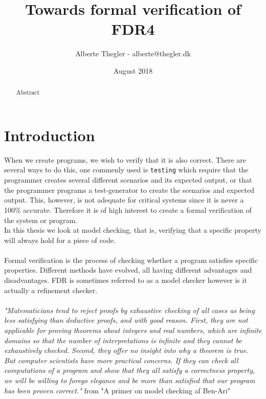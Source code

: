 \documentclass[a4paper]{report}
\title{Towards formal verification of FDR4}
\author{Alberte Thegler - alberte@thegler.dk}
\date{August 2018}
\begin{document}
\maketitle

\begin{abstract}
\begin{doublespace}
Abstract

\end{doublespace}
\end{abstract}



\newpage
\tableofcontents

\newpage
{}
\chapter{Introduction}
When we create programs, we wish to verify that it is also correct. There are several ways to do this, one commenly used is \texttt{testing} which require that the programmer creates several different scenarios and its expected output, or that the programmer programs a test-generator to create the scenarios and expected output. This, however, is not adequate for critical systems since it is never a 100\% accurate. Therefore it is of high interest to create a formal verification of the system or program.\\


In this thesis we look at model checking, that is, verifying that a specific property will always hold for a piece of code.
\\\\

Formal verification is the process of checking whether a program satisfies specific properties. Different methods have evolved, all having different advantages and disadvantages. FDR is sometimes referred to as a model checker however is it actually a refinement checker.
\\\\


\textit{"Matematicians tend to reject proofs by exhaustive checking of all cases as being less satisfying than deductive proofs, and with good reason. First, they are not applicable for proving theorems about integers and real numbers, which are infinite domains so that the number of interpretations is infinite and they cannot be exhaustively checked. Second, they offer no insight into why a theorem is true. But computer scientists have more practical concerns. If they can check all computations of a program and show that they all satisfy a correctness property, we will be willing to forego elegance and be more than satisfied that our program has been proven correct."} from "A primer on model checking af Ben-Ari" \cite{Ben-ari2010}\
\newpage
\end{document}
